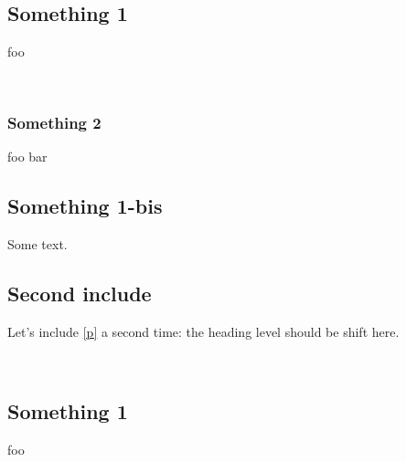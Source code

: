  \hyperref[container-page-test+u+package+++ml-module-Include+u+sections-module-type-Something]{}\label{container-page-test+u+package+++ml-module-Include+u+sections-val-something}\\
\subsection{Something 1\label{something-1}}%
foo

\label{container-page-test+u+package+++ml-module-Include+u+sections-val-foo}\\
\subsubsection{Something 2\label{something-2}}%
\label{container-page-test+u+package+++ml-module-Include+u+sections-val-bar}\begin{ocamlindent}foo bar\end{ocamlindent}%
\medbreak
\subsection{Something 1-bis\label{something-1-bis}}%
Some text.

\subsection{Second include\label{second-include}}%
Let's include \hyperref[container-page-test+u+package+++ml-module-Include+u+sections-module-type-Something]{[p\pageref*{container-page-test+u+package+++ml-module-Include+u+sections-module-type-Something}]} a second time: the heading level should be shift here.

 \hyperref[container-page-test+u+package+++ml-module-Include+u+sections-module-type-Something]{}\label{container-page-test+u+package+++ml-module-Include+u+sections-val-something}\\
\subsection{Something 1\label{something-1}}%
foo

